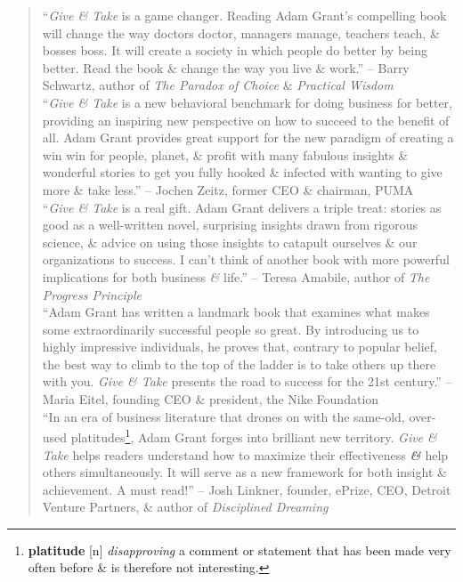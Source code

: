 \documentclass[oneside]{book}
\numberwithin{equation}{section}
\begin{document}
\begin{quotation}
	``\textit{Give \& Take} is a game changer. Reading Adam Grant's compelling book will change the way doctors doctor, managers manage, teachers teach, \& bosses boss. It will create a society in which people do better by being better. Read the book \& change the way you live \& work.'' -- Barry Schwartz, author of \textit{The Paradox of Choice} \& \textit{Practical Wisdom}\\
	
	``\textit{Give \& Take} is a new behavioral benchmark for doing business for better, providing an inspiring new perspective on how to succeed to the benefit of all. Adam Grant provides great support for the new paradigm of creating a win win for people, planet, \& profit with many fabulous insights \& wonderful stories to get you fully hooked \& infected with wanting to give more \& take less.'' -- Jochen Zeitz, former CEO \& chairman, PUMA\\
	
	``\textit{Give \& Take} is a real gift. Adam Grant delivers a triple treat: stories as good as a well-written novel, surprising insights drawn from rigorous science, \& advice on using those insights to catapult ourselves \& our organizations to success. I can't think of another book with more powerful implications for both business \textit{\&} life.'' -- Teresa Amabile, author of \textit{The Progress Principle}\\
	
	``Adam Grant has written a landmark book that examines what makes some extraordinarily successful people so great. By introducing us to highly impressive individuals, he proves that, contrary to popular belief, the best way to climb to the top of the ladder is to take others up there with you. \textit{Give \& Take} presents the road to success for the 21st century.'' -- Maria Eitel, founding CEO \& president, the Nike Foundation\\
	
	``In an era of business literature that drones on with the same-old, over-used platitudes\footnote{\textbf{platitude} [n] \textit{disapproving} a comment or statement that has been made very often before \& is therefore not interesting.}, Adam Grant forges into brilliant new territory. \textit{Give \& Take} helps readers understand how to maximize their effectiveness \textbf{\textit{\&}} help others simultaneously. It will serve as a new framework for both insight \& achievement. A must read!'' -- Josh Linkner, founder, ePrize, CEO, Detroit Venture Partners, \& author of \textit{Disciplined Dreaming}\\
	

\end{quotation}
\end{document}
